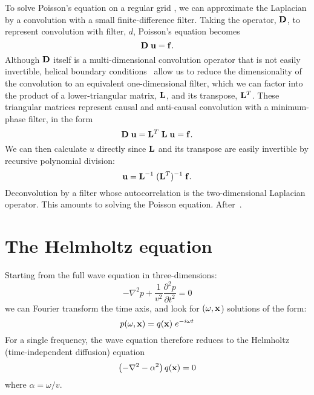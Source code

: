 \par
To solve Poisson's equation on a regular grid
\cite{Claerbout.sep.95.jon1}, we can approximate the 
Laplacian by a convolution with a small finite-difference filter.
Taking the operator, ${\bf D}$, to represent convolution with filter,
$d$, Poisson's equation becomes
\begin{equation}
{\bf D \; u}={\bf f}.
\end{equation}
Although ${\bf D}$ itself is a multi-dimensional convolution operator
that is not easily invertible, helical boundary
conditions~\cite{Claerbout.sep.95.jon1} allow us to reduce the
dimensionality of the convolution to an equivalent one-dimensional
filter, which we can factor into the product of a lower-triangular
matrix, ${\bf L}$, and its transpose, ${\bf L}^T$. These triangular
matrices represent causal and anti-causal convolution with a
minimum-phase filter, in the form
\begin{equation}
{\bf D \; u}={\bf L}^T \; {\bf L} \; {\bf u}={\bf f}.
\end{equation}
We can then calculate $u$ directly since ${\bf L}$ and its transpose
are easily invertible by recursive polynomial division:
\begin{equation}
{\bf u} = {\bf L}^{-1} \; ({\bf L}^T)^{-1} \; {\bf f}.
\end{equation}
 { 
Deconvolution by a filter whose autocorrelation
is the two-dimensional Laplacian operator.
This amounts to solving the Poisson equation.
After~.
}

\section{The Helmholtz equation}
Starting from the full wave equation in three-dimensions:
\begin{equation}
-\nabla^2 p + \frac{1}{v^2} \frac{\partial^2 p}{\partial t^2}=0
\end{equation}
we can Fourier transform the time axis, and look for $(\omega, {\bf x}$)
solutions of the form:
\begin{equation}
p(\omega,{\bf x}) = q ({\bf x}) \; e^{-i \omega t}
\end{equation}
For a single frequency, the wave equation therefore reduces to the
Helmholtz (time-independent diffusion) equation
\begin{equation} \label{eqn:helmholtz}
\left(-\nabla^2 - \alpha^2\right) q({\bf x})=0
\end{equation}
where $\alpha=\omega/v$.

